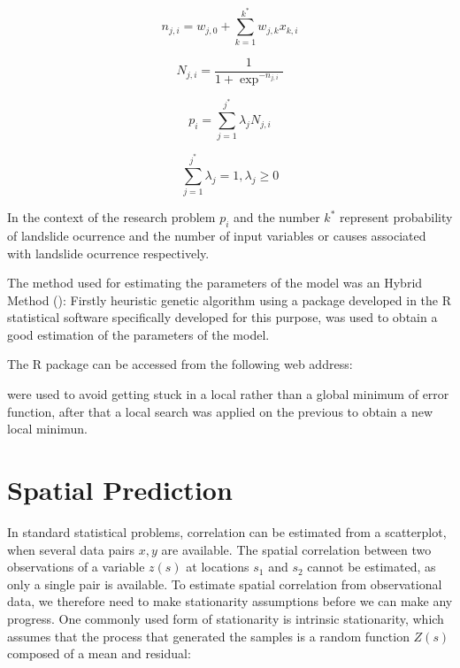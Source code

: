 \documentclass[11pt,twoside]{rmta2010esp}%
\begin{document}
\begin{equation}
n_{j,i} = w_{j,0} + \sum_{k=1}^{k^{*}} w_{j,k}x_{k,i}
\end{equation}

\begin{equation}
N_{j,i} = \frac{1}{1+\exp^{-n_{j,i}}}
\end{equation}



\begin{equation}
p_{i} = \sum_{j=1}^{j^{*}} \lambda_{j} N_{j,i}
\end{equation}

\begin{equation}
\sum_{j=1}^{j^{*}} \lambda_{j} = 1 , \lambda_{j} \ge 0
\end{equation}



In the context of the research problem $p_{i} $ and the number $ k^{*} $ represent 
probability of landslide ocurrence and the number of input variables or causes associated with landslide ocurrence respectively.

The method used for estimating the parameters of the model was an Hybrid Method (\cite{McNelis2005}): Firstly heuristic genetic algorithm using a package developed in the R statistical software specifically developed for this purpose, was used to obtain 
a good estimation of the parameters of the model. 

The R package can be accessed from the following web address:
 





 were used to avoid getting stuck in a local rather than a global minimum of error function, after that a local search was applied on the previous  to obtain a new local minimun.  


\section{Spatial Prediction}
In standard statistical problems, correlation can be estimated from a scatterplot, when several data pairs ${x, y}$ are available. The spatial correlation between two observations of a variable $z(s)$ at locations $s_{1}$ and $s_{2}$ cannot be estimated, as only a single pair is available. To estimate spatial correlation
from observational data, we therefore need to make stationarity assumptions
before we can make any progress. One commonly used form of stationarity
is intrinsic stationarity, which assumes that the process that generated the
samples is a random function $Z(s)$ composed of a mean and residual:
\end{document}
